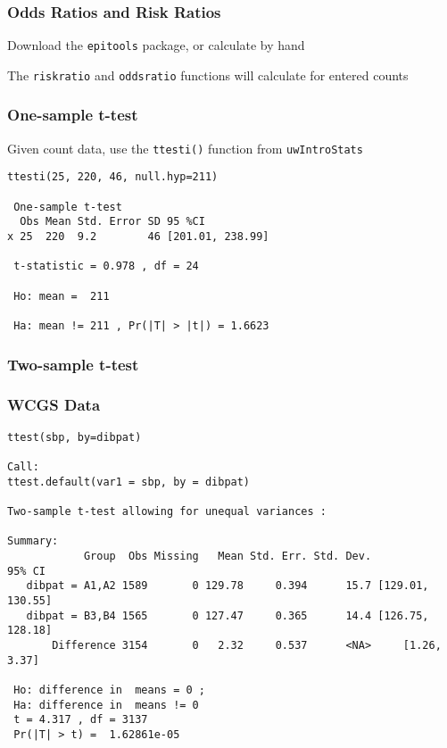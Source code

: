 \documentclass[pdf]{beamer}
\begin{document}
\begin{frame}[fragile]
\frametitle{Odds Ratios and Risk Ratios}
Download the \texttt{epitools} package, or calculate by hand

The \texttt{riskratio} and \texttt{oddsratio} functions will calculate for entered counts
\end{frame}

\begin{frame}[fragile]
\frametitle{One-sample t-test}
Given count data, use the \texttt{ttesti()} function from \texttt{uwIntroStats}

\begin{verbatim}
ttesti(25, 220, 46, null.hyp=211)

 One-sample t-test 
  Obs Mean Std. Error SD 95 %CI          
x 25  220  9.2        46 [201.01, 238.99]

 t-statistic = 0.978 , df = 24 

 Ho: mean =  211 

 Ha: mean != 211 , Pr(|T| > |t|) = 1.6623 
\end{verbatim}
\end{frame}

\begin{frame}[fragile]
\frametitle{Two-sample t-test}
\frametitle{WCGS Data}
{\fontsize{7pt}{7.2}\selectfont
\begin{verbatim}
ttest(sbp, by=dibpat)

Call:
ttest.default(var1 = sbp, by = dibpat)

Two-sample t-test allowing for unequal variances :
 
Summary:
            Group  Obs Missing   Mean Std. Err. Std. Dev.           95% CI
   dibpat = A1,A2 1589       0 129.78     0.394      15.7 [129.01, 130.55]
   dibpat = B3,B4 1565       0 127.47     0.365      14.4 [126.75, 128.18]
       Difference 3154       0   2.32     0.537      <NA>     [1.26, 3.37]

 Ho: difference in  means = 0 ; 
 Ha: difference in  means != 0 
 t = 4.317 , df = 3137 
 Pr(|T| > t) =  1.62861e-05 
\end{verbatim}}
\end{frame}
\end{document}
